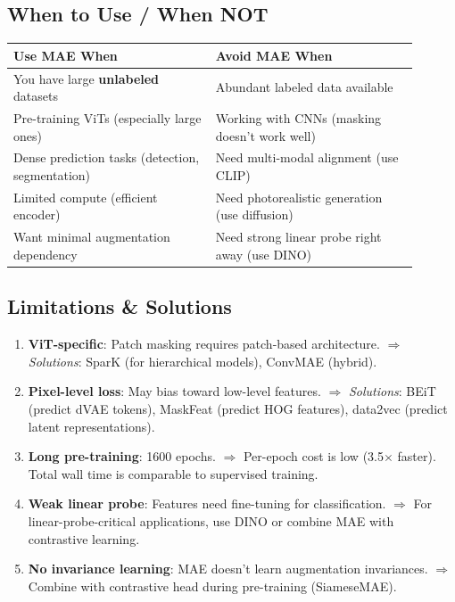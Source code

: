 \subsection{When to Use / When NOT}
\begin{center}\small
\begin{tabular}{p{0.45\linewidth}p{0.45\linewidth}}\toprule
\textbf{Use MAE When} & \textbf{Avoid MAE When} \\\midrule
You have large \textbf{unlabeled} datasets & Abundant labeled data available \\
Pre-training ViTs (especially large ones) & Working with CNNs (masking doesn't work well) \\
Dense prediction tasks (detection, segmentation) & Need multi-modal alignment (use CLIP) \\
Limited compute (efficient encoder) & Need photorealistic generation (use diffusion) \\
Want minimal augmentation dependency & Need strong linear probe right away (use DINO) \\
\bottomrule
\end{tabular}
\end{center}

\subsection{Limitations \& Solutions}
\begin{enumerate}
\item \textbf{ViT-specific}: Patch masking requires patch-based architecture. $\Rightarrow$ \textit{Solutions}: SparK (for hierarchical models), ConvMAE (hybrid).
\item \textbf{Pixel-level loss}: May bias toward low-level features. $\Rightarrow$ \textit{Solutions}: BEiT (predict dVAE tokens), MaskFeat (predict HOG features), data2vec (predict latent representations).
\item \textbf{Long pre-training}: 1600 epochs. $\Rightarrow$ Per-epoch cost is low (3.5$\times$ faster). Total wall time is comparable to supervised training.
\item \textbf{Weak linear probe}: Features need fine-tuning for classification. $\Rightarrow$ For linear-probe-critical applications, use DINO or combine MAE with contrastive learning.
\item \textbf{No invariance learning}: MAE doesn't learn augmentation invariances. $\Rightarrow$ Combine with contrastive head during pre-training (SiameseMAE).
\end{enumerate}

